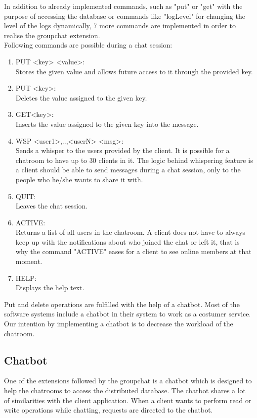 In addition to already implemented commands, such as "put" or "get" with the purpose of accessing the database or commands like "logLevel" for changing the level of the logs dynamically, 7 more commands are implemented in order to realise the groupchat extension.\\
Following commands are possible during a chat session:
\begin{enumerate}
  \item 	PUT <key> <value>: \\
Stores the given value and allows future access to it through the provided key. 
  \item PUT <key>:\\
Deletes the value assigned to the given key.
  \item GET{<key>}:\\
Inserts the value assigned to the given key into the message.
  \item WSP <user1>,..,<userN> <msg>:\\
Sends a whisper to the users provided by the client. It is possible for a chatroom to have     up to 30 clients in it. The logic behind whispering feature is a client should be able to send messages during a chat session, only to the people who he/she wants to share it with.  
  \item QUIT:\\
  Leaves the chat session.
  \item ACTIVE:\\
   Returns a list of all users in the chatroom. A client does not have to always keep up with the notifications about who joined the chat or left it, that is why the command "ACTIVE" eases for a client to see online members at that moment.
  \item HELP:\\
  Displays the help text.
\end{enumerate}
Put and delete operations are fulfilled with the help of a chatbot. Most of the software systems include a chatbot in their system to work as a costumer service. Our intention by implementing a chatbot is to decrease the workload of the chatroom.

\subsection{Chatbot}
\label{sec:groupchat_chatbot}
One of the extensions followed by the groupchat is a chatbot which is designed to help the chatrooms to access the distributed database. The chatbot shares a lot of similarities with the client application. When a client wants to perform read or write operations while chatting, requests are directed to the chatbot.



